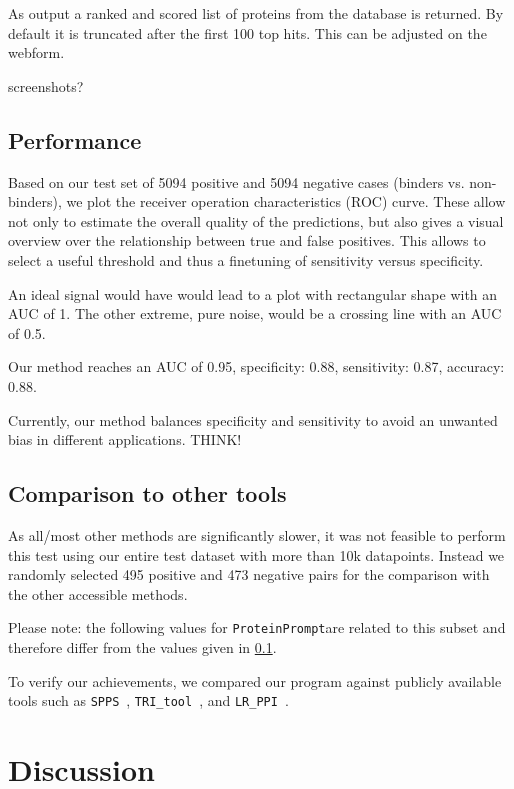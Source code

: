 \documentclass[preprint,3p,times,twocolumn]{elsarticle}
\newcommand{\TODO}[1] {\begingroup\color{red}#1\endgroup}
\newcommand{\spps}{\texttt{SPPS}}
\newcommand{\tri}{\texttt{TRI\_tool}}
\newcommand{\lr}{\texttt{LR\_PPI}}
\newcommand{\tool}{\texttt{ProteinPrompt}\hspace{2pt}}
\begin{document}
As output a ranked and scored list of proteins from the database is returned.
By default it is truncated after the first 100 top hits.
This can be adjusted on the webform.

\TODO{ screenshots?}

\subsection{Performance}
\label{performance}

Based on our test set of 5094 positive and 5094 negative cases (binders vs. non-binders), we plot the receiver operation characteristics (ROC) curve. These allow not only to estimate the overall quality of the predictions, but also gives a visual overview over the relationship between true and false positives.
This allows to select a useful threshold and thus a finetuning of sensitivity versus specificity.

An ideal signal would have would lead to a plot with rectangular shape with an AUC of 1.
The other extreme, pure noise, would be a crossing line with an AUC of 0.5.

Our method reaches an AUC of 0.95,
specificity: 0.88,
sensitivity: 0.87,
accuracy: 0.88.

Currently, our method balances specificity and sensitivity to avoid an unwanted bias in different applications. \TODO{THINK!}



\subsection{Comparison to other tools}

As \TODO{all/most} other methods are significantly slower, it was not feasible to perform this test using our entire test dataset with more than 10k datapoints. Instead we randomly selected 495 positive and 473 negative pairs for the comparison with the other accessible methods.

Please note: the following values for \tool are related to this subset and therefore differ from the values given in \ref{performance}.

To verify our achievements, we compared our program against publicly available tools such as \spps\ \cite{Liu:2012}, \tri\ \cite{Perovic:2017}, and \lr\ \cite{Pan:2010}.


\section{Discussion}
\end{document}
